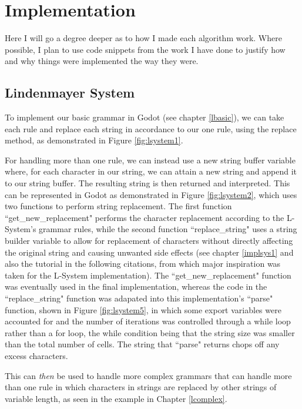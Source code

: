 \chapter{Implementation} \label{Implementation}


Here I will go a degree deeper as to how I made each algorithm work. Where possible, I plan to use code snippets from the work I have done to justify how and why things were implemented the way they were.

\section{Lindenmayer System} \label{implsys2}

To implement our basic grammar in Godot (see chapter \ref{lbasic}), we can take each rule and replace each string in accordance to our one rule, using the replace method, as demonstrated in Figure \ref{fig:lsystem1}.

For handling more than one rule, we can instead use a new string buffer variable where, for each character in our string, we can attain a new string and append it to our string buffer. The resulting string is then returned and interpreted. This can be represented in Godot as demonstrated in Figure \ref{fig:lsystem2}, which uses two functions to perform string replacement. The first function ``get\_new\_replacement" performs the character replacement according to the L-System's grammar rules, while the second function ``replace\_string" uses a string builder variable to allow for replacement of characters without directly affecting the original string and causing unwanted side effects (see chapter \ref{implsys1} and also the tutorial in the following citations\cite{codatGD3LSystemYT}\cite{codatGD3LSystemGH}\cite{codatGD4LSystemGH}, from which major inspiration was taken for the L-System implementation). The ``get\_new\_replacement" function was eventually used in the final implementation, whereas the code in the ``replace\_string" function was adapated into this implementation's ``parse" function, shown in Figure \ref{fig:lsystem5}, in which some export variables were accounted for and the number of iterations was controlled through a while loop rather than a for loop, the while condition being that the string size was smaller than the total number of cells. The string that ``parse" returns chops off any excess characters.

This can \textit{then} be used to handle more complex grammars that can handle more than one rule in which characters in strings are replaced by other strings of variable length, as seen in the example in Chapter \ref{lcomplex}.

